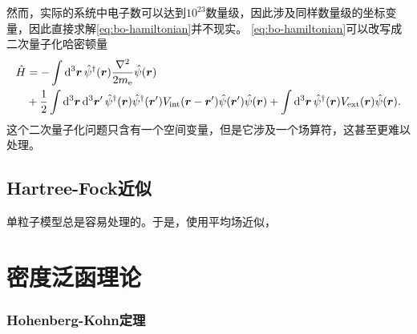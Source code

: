 \documentclass[hyperref, UTF8, a4paper]{ctexart}
\begin{document}
然而，实际的系统中电子数可以达到$10^{23}$数量级，因此涉及同样数量级的坐标变量，因此直接求解\eqref{eq:bo-hamiltonian}并不现实。
\eqref{eq:bo-hamiltonian}可以改写成二次量子化哈密顿量
\begin{equation}
    \begin{aligned}
        \hat{H} &= - \int \dd[3]{\vb*{r}} \hat{\psi}^\dagger(\vb*{r}) \frac{\laplacian}{2m_\text{e}} \hat{\psi}(\vb*{r}) \\
        &+ \frac{1}{2} \int \dd[3]{\vb*{r}} \dd[3]{\vb*{r}'} \hat{\psi}^\dagger (\vb*{r}) \hat{\psi}^\dagger (\vb*{r}') V_\text{int} (\vb*{r} - \vb*{r}') \hat{\psi}(\vb*{r}') \hat{\psi}(\vb*{r}) + \int \dd[3]{\vb*{r}} \hat{\psi}^\dagger(\vb*{r}) V_\text{ext}(\vb*{r}) \hat{\psi}(\vb*{r}).
    \end{aligned}
    \label{eq:bo-second-hamiltonian}
\end{equation}
这个二次量子化问题只含有一个空间变量，但是它涉及一个场算符，这甚至更难以处理。

\subsection{Hartree-Fock近似}

单粒子模型总是容易处理的。于是，使用平均场近似，

\section{密度泛函理论}

\subsubsection{Hohenberg-Kohn定理}
\end{document}

